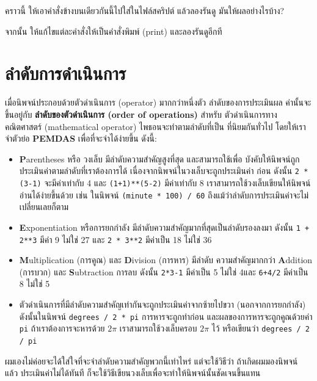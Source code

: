 คราวนี้ ให้เอาคำสั่งข้างบนเดียวกันนี้ไปใส่ในไฟล์สคริปต์ แล้วลองรันดู
มันให้ผลอย่างไรบ้าง?

จากนั้น ให้แก้ไขแต่ละคำสั่งให้เป็นคำสั่งพิมพ์ (print) และลองรันดูอีกที



\section{ลำดับการดำเนินการ } %

เมื่อนิพจน์ประกอบด้วยตัวดำเนินการ (operator) มากกว่าหนึ่งตัว ลำดับของการประเมินผล
ค่านั้นจะขึ้นอยู่กับ {\bf ลำดับของตัวดำเนินการ (order of operations)} สำหรับ
ตัวดำเนินการทางคณิตศาสตร์ (mathematical operator) ไพธอนจะทำตามลำดับที่เป็น
ที่นิยมกันทั่วไป โดยให้เราจำตัวย่อ {\bf PEMDAS} เพื่อที่จะจำได้ง่ายขึ้น ดังนี้:

\begin{itemize}

\item {\bf P}arentheses หรือ วงเล็บ มีลำดับความสำคัญสูงที่สุด และสามารถใช้เพื่อ
บังคับให้นิพจน์ถูกประเมินค่าตามลำดับที่เราต้องการได้  เนื่องจากนิพจน์ในวงเล็บจะถูกประเมินค่า
ก่อน ดังนั้น {\tt 2 * (3-1)} จะมีค่าเท่ากับ 4 และ {\tt (1+1)**(5-2)} มีค่าเท่ากับ 8 
 เราสามารถใช้วงเล็บเขียนให้นิพจน์อ่านได้ง่ายขึ้นด้วย เช่น ในนิพจน์  {\tt (minute * 100) / 60} 
 ถึงแม้ว่าลำดับการประเมินค่าจะไม่เปลี่ยนเลยก็ตาม

\item {\bf E}xponentiation หรือการยกกำลัง มีลำดับความสำคัญมากที่สุดเป็นลำดับรองลงมา 
ดังนั้น {\tt 1 + 2**3} มีค่า 9 ไม่ใช่ 27 และ {\tt 2 * 3**2} มีค่าเป็น 18 ไม่ใช่ 36

\item {\bf M}ultiplication (การคูณ) และ {\bf D}ivision (การหาร) มีลำดับ
ความสำคัญมากกว่า {\bf A}ddition (การบวก) และ {\bf S}ubtraction การลบ ดังนั้น 
{\tt 2*3-1} มีค่าเป็น 5 ไม่ใช่ 4และ {\tt 6+4/2} มีค่าเป็น 8 ไม่ใช่ 5

\item ตัวดำเนินการที่มีลำดับความสำคัญเท่ากันจะถูกประเมินค่าจากซ้ายไปขวา (นอกจากการยกกำลัง)
 ดังนั้นในนิพจน์ {\tt degrees / 2 * pi} การหารจะถูกทำก่อน และผลของการหารจะถูกคูณด้วยค่า 
 {\tt pi} ถ้าเราต้องการจะหารด้วย $2 \pi$ เราสามารถใช้วงเล็บครอบ $2 \pi$ ไว้ หรือเขียนว่า 
 {\tt degrees / 2 / pi}

\end{itemize}

ผมเองไม่ค่อยจะได้ใส่ใจที่จะจำลำดับความสำคัญพวกนี้เท่าไหร่ แต่จะใช้วิธีว่า ถ้าเกิดผมมองนิพจน์ แล้ว
ประเมินค่าไม่ได้ทันที ก็จะใช้วิธีเขียนวงเล็บเพื่อจะทำให้นิพจน์นั้นชัดเจนขึ้นแทน



